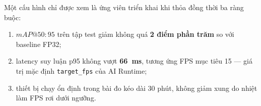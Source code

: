 Một cấu hình chỉ được xem là ứng viên triển khai khi thỏa đồng thời ba ràng buộc:
\begin{enumerate}
  \item $mAP@50{:}95$ trên tập test giảm không quá \textbf{2 điểm phần trăm} so
        với baseline FP32;
  \item latency suy luận p95 không vượt \textbf{66~ms}, tương ứng FPS mục tiêu
        15 --- giá trị mặc định \texttt{target\_fps} của AI Runtime;
  \item thiết bị chạy ổn định trong bài đo kéo dài 30 phút, không giảm xung do
        nhiệt làm FPS rơi dưới ngưỡng.
\end{enumerate}
